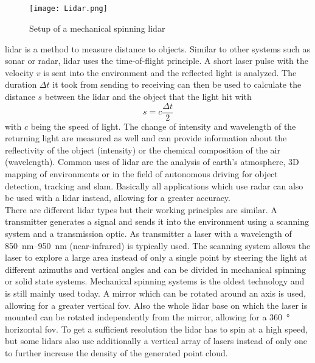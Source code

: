 \subsection{}
\begin{figure}[htb]
	\centering
	\texttt{[image: Lidar.png]}
	\caption{Setup of a mechanical spinning \acrshort{lidar} \cite{Li2020}}
	\label{fig:lidar}
\end{figure}
\gls{lidar} is a method to measure distance to objects.
Similar to other systems such as \gls{sonar} or \gls{radar}, \gls{lidar} uses the time-of-flight principle.
A short laser pulse with the velocity $v$ is sent into the environment and the reflected light is analyzed.
The duration $\Delta t$ it took from sending to receiving can then be used to calculate the distance $s$ between the \gls{lidar} and the object that the light hit with
\begin{equation}
	s = c\frac{\Delta t}{2}
\end{equation}
with $c$ being the speed of light.
The change of intensity and wavelength of the returning light are measured as well and can provide information about the reflectivity of the object (intensity) or the chemical composition of the air (wavelength).
Common uses of \gls{lidar} are the analysis of earth's atmosphere, 3D mapping of environments or in the field of autonomous driving for object detection, tracking and \gls{slam}.
Basically all applications which use \gls{radar} can also be used with a \gls{lidar} instead, allowing for a greater accuracy.\\
There are different \gls{lidar} types but their working principles are similar.
A transmitter generates a signal and sends it into the environment using a scanning system and a transmission optic.
As transmitter a laser with a wavelength of \SIrange{850}{950}{\nano\metre} (near-infrared) is typically used.
The scanning system allows the laser to explore a large area instead of only a single point by steering the light at different azimuths and vertical angles and can be divided in mechanical spinning or solid state systems.
Mechanical spinning systems is the oldest technology and is still mainly used today.
A mirror which can be rotated around an axis is used, allowing for a greater vertical \gls{fov}.
Also the whole \gls{lidar} base on which the laser is mounted can be rotated independently from the mirror, allowing for a \SI{360}{\degree} horizontal \gls{fov}.
To get a sufficient resolution the \gls{lidar} has to spin at a high speed, but some \gls{lidar}s also use additionally a vertical array of lasers instead of only one to further increase the density of the generated point cloud.
